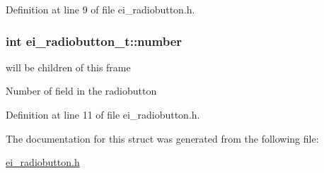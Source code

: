 Definition at line 9 of file ei\+\_\+radiobutton.\+h.

\hypertarget{structei__radiobutton__t_a0b39fd134b987b3bfc1a850c4169886d}{
\subsubsection[{number}]{\setlength{\rightskip}{0pt plus 5cm}int ei\+\_\+radiobutton\+\_\+t\+::number}}\label{structei__radiobutton__t_a0b39fd134b987b3bfc1a850c4169886d}


will be children of this frame 

Number of field in the radiobutton 

Definition at line 11 of file ei\+\_\+radiobutton.\+h.



The documentation for this struct was generated from the following file\+:\begin{DoxyCompactItemize}
\item 
\hyperlink{ei__radiobutton_8h}{ei\+\_\+radiobutton.\+h}\end{DoxyCompactItemize}

